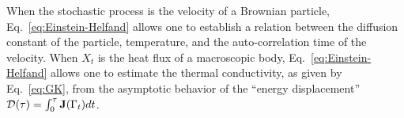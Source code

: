 When the stochastic process is the velocity of a Brownian particle, Eq.~\eqref{eq:Einstein-Helfand} allows one to establish a relation between the diffusion constant of the particle, temperature, and the auto-correlation time of the velocity.  When $X_t$ is the heat flux of a macroscopic body, Eq.~\eqref{eq:Einstein-Helfand} allows one to estimate the thermal conductivity, as given by Eq.~\eqref{eq:GK}, from the asymptotic behavior of the ``energy displacement'' $\mathcal{D}(\tau) = \int_0^\tau \mathbf{J}({\mathrm\Gamma}_t) dt $. 

